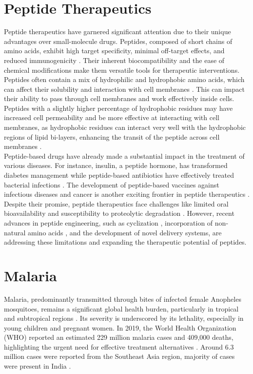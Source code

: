 \section{Peptide Therapeutics} 
Peptide therapeutics have garnered significant attention due to their unique advantages over
small-molecule drugs. Peptides, composed of short chains of amino acids, exhibit high target
specificity, minimal off-target effects, and reduced immunogenicity \cite{wang2022therapeutic}.
Their inherent biocompatibility and the ease of chemical modifications make them versatile tools for
therapeutic interventions. Peptides often contain a mix of hydrophilic and hydrophobic amino acids,
which can affect their solubility and interaction with cell membranes \cite{madani2011mech}. This
can impact their ability to pass through cell membranes and work effectively inside cells. Peptides
with a slightly higher percentage of hydrophobic residues may have increased cell permeability
\cite{madani2011mech} and be more effective at interacting with cell membranes, as hydrophobic
residues can interact very well with the hydrophobic regions of lipid bi-layers, enhancing the
transit of the peptide across cell membranes \cite{madani2011mech}. \\

Peptide-based drugs have already made a substantial impact in the treatment of various diseases. For
instance, insulin, a peptide hormone, has transformed diabetes management while peptide-based
antibiotics have effectively treated bacterial infections \cite{cesar2023adv}. The development of
peptide-based vaccines against infectious diseases and cancer is another exciting frontier in
peptide therapeutics \cite{purcell2007vaccine}. \\

Despite their promise, peptide therapeutics face challenges like limited oral bioavailability and
susceptibility to proteolytic degradation \cite{muttenthaler2021trends}. However, recent advances in
peptide engineering, such as cyclization \cite{hayes2021cycl}, incorporation of non-natural amino
acids \cite{li2022nonnat}, and the development of novel delivery systems, are addressing these
limitations and expanding the therapeutic potential of peptides.

\section{Malaria} 
Malaria, predominantly transmitted through bites of infected female Anopheles mosquitoes, remains a
significant global health burden, particularly in tropical and subtropical regions
\cite{duguma2022ethiopia, ghosh2021malaria}. Its severity is underscored by its lethality,
especially in young children and pregnant women. In 2019, the World Health Organization (WHO)
reported an estimated 229 million malaria cases and 409,000 deaths, highlighting the urgent need for
effective treatment alternatives \cite{jain2022pregnancy}. Around 6.3 million cases were reported
from the Southeast Asia region, majority of cases were present in India
\cite{cristina2020pregnancy}. \\

